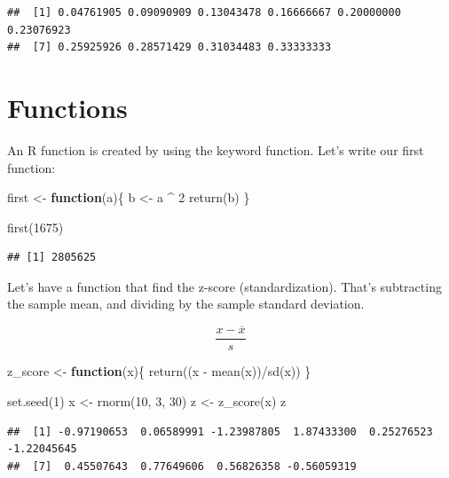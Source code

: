 \documentclass[
]{book}
\newenvironment{Shaded}{\begin{snugshade}}{\end{snugshade}}
\newcommand{\ControlFlowTok}[1]{\textcolor[rgb]{0.13,0.29,0.53}{\textbf{#1}}}
\newcommand{\DecValTok}[1]{\textcolor[rgb]{0.00,0.00,0.81}{#1}}
\newcommand{\FunctionTok}[1]{\textcolor[rgb]{0.00,0.00,0.00}{#1}}
\newcommand{\NormalTok}[1]{#1}
\newcommand{\OtherTok}[1]{\textcolor[rgb]{0.56,0.35,0.01}{#1}}
\newcommand{\SpecialCharTok}[1]{\textcolor[rgb]{0.00,0.00,0.00}{#1}}
\begin{document}
\begin{verbatim}
##  [1] 0.04761905 0.09090909 0.13043478 0.16666667 0.20000000 0.23076923
##  [7] 0.25925926 0.28571429 0.31034483 0.33333333
\end{verbatim}

\hypertarget{functions}{%
\section{Functions}\label{functions}}

An R function is created by using the keyword function. Let's write our first function:

\begin{Shaded}
\begin{Highlighting}[]
\NormalTok{first }\OtherTok{\textless{}{-}} \ControlFlowTok{function}\NormalTok{(a)\{}
\NormalTok{  b }\OtherTok{\textless{}{-}}\NormalTok{ a }\SpecialCharTok{\^{}} \DecValTok{2}
  \FunctionTok{return}\NormalTok{(b)}
\NormalTok{\}}

\FunctionTok{first}\NormalTok{(}\DecValTok{1675}\NormalTok{)}
\end{Highlighting}
\end{Shaded}

\begin{verbatim}
## [1] 2805625
\end{verbatim}

Let's have a function that find the z-score (standardization). That's subtracting the sample mean, and dividing by the sample standard deviation.

\[
\frac{x-\overline{x}}{s}
\]

\begin{Shaded}
\begin{Highlighting}[]
\NormalTok{z\_score }\OtherTok{\textless{}{-}} \ControlFlowTok{function}\NormalTok{(x)\{}
  \FunctionTok{return}\NormalTok{((x }\SpecialCharTok{{-}} \FunctionTok{mean}\NormalTok{(x))}\SpecialCharTok{/}\FunctionTok{sd}\NormalTok{(x))}
\NormalTok{\}}

\FunctionTok{set.seed}\NormalTok{(}\DecValTok{1}\NormalTok{)}
\NormalTok{x }\OtherTok{\textless{}{-}} \FunctionTok{rnorm}\NormalTok{(}\DecValTok{10}\NormalTok{, }\DecValTok{3}\NormalTok{, }\DecValTok{30}\NormalTok{)}
\NormalTok{z }\OtherTok{\textless{}{-}} \FunctionTok{z\_score}\NormalTok{(x)}
\NormalTok{z}
\end{Highlighting}
\end{Shaded}

\begin{verbatim}
##  [1] -0.97190653  0.06589991 -1.23987805  1.87433300  0.25276523 -1.22045645
##  [7]  0.45507643  0.77649606  0.56826358 -0.56059319
\end{verbatim}
\end{document}
